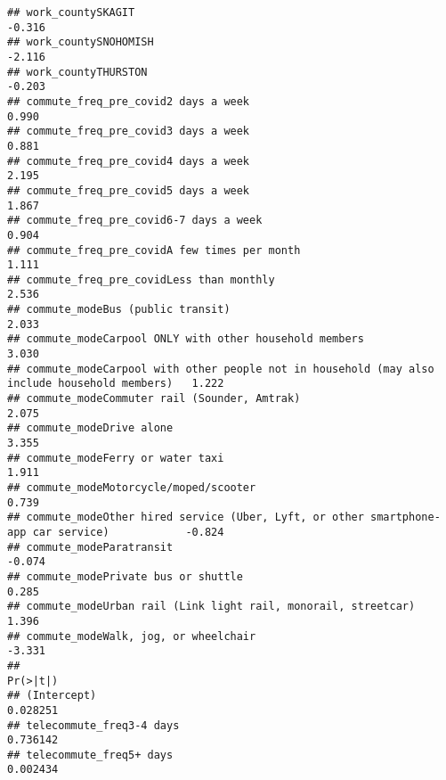 \documentclass[
]{article}
\begin{document}
\begin{verbatim}
## work_countySKAGIT                                                                            -0.316
## work_countySNOHOMISH                                                                         -2.116
## work_countyTHURSTON                                                                          -0.203
## commute_freq_pre_covid2 days a week                                                           0.990
## commute_freq_pre_covid3 days a week                                                           0.881
## commute_freq_pre_covid4 days a week                                                           2.195
## commute_freq_pre_covid5 days a week                                                           1.867
## commute_freq_pre_covid6-7 days a week                                                         0.904
## commute_freq_pre_covidA few times per month                                                   1.111
## commute_freq_pre_covidLess than monthly                                                       2.536
## commute_modeBus (public transit)                                                              2.033
## commute_modeCarpool ONLY with other household members                                         3.030
## commute_modeCarpool with other people not in household (may also include household members)   1.222
## commute_modeCommuter rail (Sounder, Amtrak)                                                   2.075
## commute_modeDrive alone                                                                       3.355
## commute_modeFerry or water taxi                                                               1.911
## commute_modeMotorcycle/moped/scooter                                                          0.739
## commute_modeOther hired service (Uber, Lyft, or other smartphone-app car service)            -0.824
## commute_modeParatransit                                                                      -0.074
## commute_modePrivate bus or shuttle                                                            0.285
## commute_modeUrban rail (Link light rail, monorail, streetcar)                                 1.396
## commute_modeWalk, jog, or wheelchair                                                         -3.331
##                                                                                             Pr(>|t|)
## (Intercept)                                                                                 0.028251
## telecommute_freq3-4 days                                                                    0.736142
## telecommute_freq5+ days                                                                     0.002434

\end{verbatim}
\end{document}
